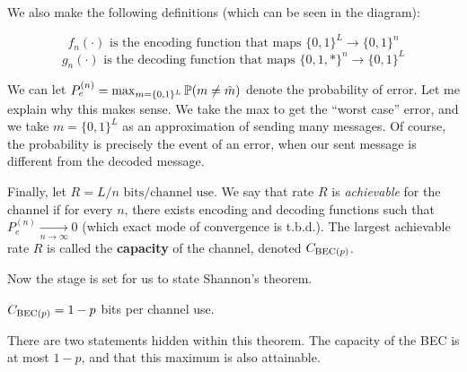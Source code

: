 \documentclass[11 pt]{scrartcl}
\begin{document}
We also make the following definitions (which can be seen in the diagram): 

\[ f_n(\cdot) \text{ is the encoding function that maps } \{0,1\}^L\to\{0,1\}^n \] 
\[ g_n(\cdot) \text{ is the decoding function that maps } \{0,1, *\}^n\to\{0,1\}^L \] 

We can let $P_e^{(n)} = \max_{m=\{0,1\}^L} \mathbb P(m\not= \hat{m})$ denote the probability of error. Let me explain why this makes sense. We take the max to get the ``worst case'' error, and we take $m = \{0,1\}^L$ as an approximation of sending many messages. Of course, the probability is precisely the event of an error, when our sent message is different from the decoded message.

Finally, let $R = L/n \text{ bits/channel use}$. We say that rate $R$ is \emph{achievable} for the channel if for every $n$, there exists encoding and decoding functions such that $P_e^{(n)} \xrightarrow[n\to\infty]{} 0$ (which exact mode of convergence is t.b.d.). The largest achievable rate $R$ is called the \textbf{capacity} of the channel, denoted $C_{\text{BEC}(p)}$. 

Now the stage is set for us to state Shannon's theorem. 
\begin{theorem}[Shannon 1948]
    $C_{\text{BEC}(p)} = 1-p$ bits per channel use. 
\end{theorem}

There are two statements hidden within this theorem. The capacity of the BEC is at most $1-p$, and that this maximum is also attainable. 
\end{document}
